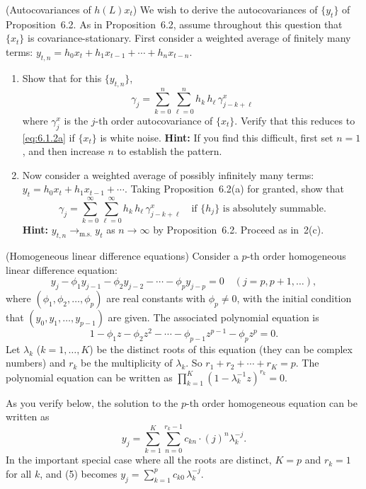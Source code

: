 \begin{problemset}
\exercise[3] (Autocovariances of $h(L)x_t$) \; We wish to derive the autocovariances of $\{y_t\}$
of Proposition~6.2. As in Proposition~6.2, assume throughout this question that
$\{x_t\}$ is covariance-stationary. First consider a weighted average of finitely many
terms: $y_{t,n} = h_0 x_t + h_1 x_{t-1} + \cdots + h_n x_{t-n}$.

\begin{enumerate}[label=(\alph*)]
\item Show that for this $\{y_{t,n}\}$,
\[
  \gamma_j = \sum_{k=0}^{n} \sum_{\ell=0}^{n} h_k\,h_\ell\,\gamma_{j-k+\ell}^x
\]
where $\gamma_j^x$ is the $j$-th order autocovariance of $\{x_t\}$.
Verify that this reduces to \eqref{eq:6.1.2a} if $\{x_t\}$ is white noise. \textbf{Hint:} If you find this
difficult, first set $n = 1$, and then increase $n$ to establish the pattern.

\item Now consider a weighted average of possibly infinitely many terms:
$y_t = h_0 x_t + h_1 x_{t-1} + \cdots$.
Taking Proposition~6.2(a) for granted, show that
\[
  \gamma_j = \sum_{k=0}^{\infty} \sum_{\ell=0}^{\infty} h_k\,h_\ell\,\gamma_{j-k+\ell}^x
  \quad \text{if } \{h_j\} \text{ is absolutely summable.}
\]
\textbf{Hint:} $y_{t,n} \to_{\mathrm{m.s.}} y_t$ as $n \to \infty$ by Proposition~6.2. Proceed as in~2(c).
\end{enumerate}

\exercise[4] (Homogeneous linear difference equations) \; Consider a $p$-th order homogeneous
linear difference equation:
\begin{equation}
  y_j - \phi_1 y_{j-1} - \phi_2 y_{j-2} - \cdots - \phi_p y_{j-p} = 0
  \quad (j = p, p+1, \ldots),
  \tag{1}
\end{equation}
where $(\phi_1, \phi_2, \ldots, \phi_p)$ are real constants with $\phi_p \neq 0$, with the initial condition
that $(y_0, y_1, \ldots, y_{p-1})$ are given. The associated polynomial equation is
\begin{equation}
  1 - \phi_1 z - \phi_2 z^2 - \cdots - \phi_{p-1} z^{p-1} - \phi_p z^p = 0.
  \tag{2}
\end{equation}
Let $\lambda_k$ ($k = 1, \ldots, K$) be the distinct roots of this equation (they can be
complex numbers) and $r_k$ be the multiplicity of $\lambda_k$. So $r_1 + r_2 + \cdots + r_K = p$.
The polynomial equation can be written as $\prod_{k=1}^{K} (1 - \lambda_k^{-1} z)^{r_k} = 0$.

As you verify below, the solution to the $p$-th order homogeneous equation
can be written as
\begin{equation}
  y_j = \sum_{k=1}^{K} \sum_{n=0}^{r_k - 1} c_{kn} \cdot (j)^n \lambda_k^{-j}.
  \tag{5}
\end{equation}
In the important special case where all the roots are distinct, $K = p$ and $r_k = 1$
for all $k$, and (5) becomes $y_j = \sum_{k=1}^{p} c_{k0}\,\lambda_k^{-j}$.


\end{problemset}
